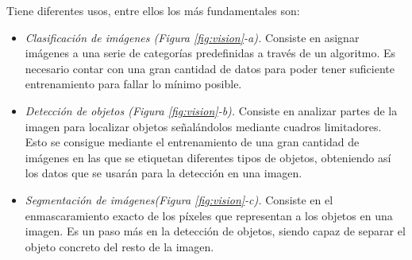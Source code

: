 Tiene diferentes usos, entre ellos los más fundamentales son:
\begin{itemize}
 \item \textit{Clasificación de imágenes (Figura \ref{fig:vision}-a).} Consiste en asignar imágenes a una serie de categorías predefinidas a través de un algoritmo. Es necesario contar con una gran cantidad de datos para poder tener suficiente entrenamiento para fallar lo mínimo posible.
 \item \textit{Detección de objetos (Figura \ref{fig:vision}-b).} Consiste en analizar partes de la imagen para localizar objetos señalándolos mediante cuadros limitadores. Esto se consigue mediante el entrenamiento de una gran cantidad de imágenes en las que se etiquetan diferentes tipos de objetos, obteniendo así los datos que se usarán para la detección en una imagen.
  \item \textit{Segmentación de imágenes(Figura \ref{fig:vision}-c).} Consiste en el enmascaramiento exacto de los píxeles que representan a los objetos en una imagen. Es un paso más en la detección de objetos, siendo capaz de separar el objeto concreto del resto de la imagen. 
\end{itemize}\
